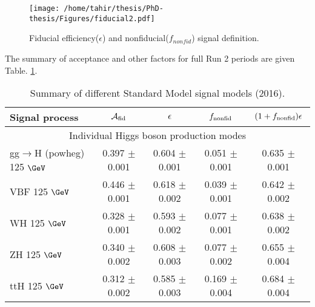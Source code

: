 \begin{figure}[!h!tb]
 \begin{center}
    \texttt{[image: /home/tahir/thesis/PhD-thesis/Figures/fiducial2.pdf]}
    \caption{Fiducial efficiency($\epsilon$) and nonfiducial($f_{nonfid}$) signal definition.}
 \label{fig:cartoon}
 \end{center}
\end{figure}

The summary of acceptance and other factors for full Run 2 periods are given Table. \ref{tab:summarySM}. 


\begin{table}[!h!tb]
\begin{center}
\small
\caption{
        Summary of different Standard Model signal models (2016).
\label{tab:summarySM}
}
\begin{tabular}{|l|c|c|c|c|} \hline \hline 
\textbf{Signal process} & $\mathcal{A}_{\rm fid}$ & $\epsilon$ & $f_{\rm nonfid}$  & $(1+f_{\rm nonfid})\epsilon$ \\ \hline \hline 
\multicolumn{5}{|c|}{Individual Higgs boson production modes} \\ \hline 
gg$\rightarrow$H ({\sc powheg}) 125 $\GeV$ & 0.397 $\pm$ 0.001 & 0.604 $\pm$ 0.001 & 0.051 $\pm$ 0.001 & 0.635 $\pm$ 0.001 \\  
 VBF 125 $\GeV$ & 0.446 $\pm$ 0.001 & 0.618 $\pm$ 0.002 & 0.039 $\pm$ 0.001 & 0.642 $\pm$ 0.002 \\  
 WH 125 $\GeV$ & 0.328 $\pm$ 0.001 & 0.593 $\pm$ 0.002 & 0.077 $\pm$ 0.001 & 0.638 $\pm$ 0.002 \\  
 ZH 125 $\GeV$  & 0.340 $\pm$ 0.002 & 0.608 $\pm$ 0.003 & 0.077 $\pm$ 0.002 & 0.655 $\pm$ 0.004 \\  
 ttH 125 $\GeV$ & 0.312 $\pm$ 0.002 & 0.585 $\pm$ 0.003 & 0.169 $\pm$ 0.004 & 0.684 $\pm$ 0.004 \\  
 
\hline \hline
\end{tabular}
\normalsize
\end{center}
\end{table}



